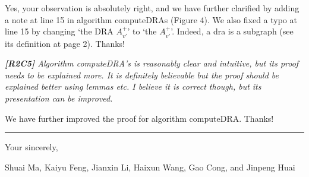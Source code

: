 \documentclass[11pt]{letter}
\newcommand{\vs}{\vspace{1ex}}
\newcommand{\svs}{\vspace{0.36ex}}
\newcommand{\dra}{{\sc dra}\xspace}
\begin{document}
Yes, your observation is absolutely right, and we have further clarified by adding a note at line 15 in algorithm computeDRAs (Figure 4).
We also fixed a typo at line 15 by changing `the DRA $A^+_{v'}$' to `the $A^+_{v'}$'. Indeed, a \dra is a subgraph (see its definition at page 2). Thanks!


\vs
\noindent
{\em{\bf[R2C5]} Algorithm computeDRA's is reasonably clear and intuitive, but its proof needs to be explained more. It is definitely believable but the proof should be explained better using lemmas etc. I believe it is correct though, but its presentation can be improved.}
\svs

We have further improved the proof for algorithm computeDRA. Thanks!




\vspace{3.6ex}
\hrule
\vspace{3.6ex}
\closing{Your sincerely,}

\vspace{-8ex}
Shuai Ma, Kaiyu Feng, Jianxin Li, Haixun Wang, Gao Cong, and Jinpeng Huai
\end{document}

